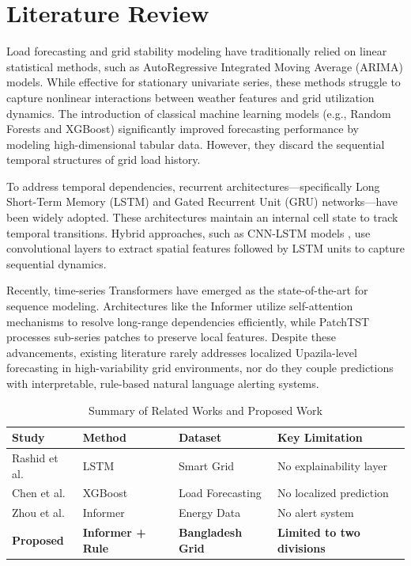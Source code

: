 \section{Literature Review}
Load forecasting and grid stability modeling have traditionally relied on linear statistical methods, such as AutoRegressive Integrated Moving Average (ARIMA) models. While effective for stationary univariate series, these methods struggle to capture nonlinear interactions between weather features and grid utilization dynamics. The introduction of classical machine learning models (e.g., Random Forests and XGBoost) significantly improved forecasting performance by modeling high-dimensional tabular data. However, they discard the sequential temporal structures of grid load history.

To address temporal dependencies, recurrent architectures—specifically Long Short-Term Memory (LSTM) \cite{c6} and Gated Recurrent Unit (GRU) \cite{c7} networks—have been widely adopted. These architectures maintain an internal cell state to track temporal transitions. Hybrid approaches, such as CNN-LSTM models \cite{c10}, use convolutional layers to extract spatial features followed by LSTM units to capture sequential dynamics.

Recently, time-series Transformers have emerged as the state-of-the-art for sequence modeling. Architectures like the Informer \cite{c1} utilize self-attention mechanisms to resolve long-range dependencies efficiently, while PatchTST \cite{c3} processes sub-series patches to preserve local features. Despite these advancements, existing literature rarely addresses localized Upazila-level forecasting in high-variability grid environments, nor do they couple predictions with interpretable, rule-based natural language alerting systems.

\begin{table}[htbp]
\caption{Summary of Related Works and Proposed Work}
\centering
\begin{tabular}{lp{1.6cm}p{2.2cm}p{2.2cm}}
\toprule
\textbf{Study} & \textbf{Method} & \textbf{Dataset} & \textbf{Key Limitation} \\
\midrule
Rashid et al. \cite{c12} & LSTM & Smart Grid & No explainability layer \\
Chen et al. \cite{c8} & XGBoost & Load Forecasting & No localized prediction \\
Zhou et al. \cite{c1} & Informer & Energy Data & No alert system \\
\textbf{Proposed} & \textbf{Informer + Rule} & \textbf{Bangladesh Grid} & \textbf{Limited to two divisions} \\
\bottomrule
\end{tabular}
\label{tab:related}
\end{table}
